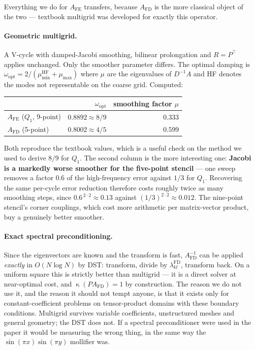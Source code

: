 \documentclass[11pt]{article}
\newcommand{\Afd}{A_{\mathrm{FD}}}
\newcommand{\Afe}{A_{\mathrm{FE}}}
\DeclareMathOperator{\cond}{\kappa}
\begin{document}
Everything we do for $\Afe$ transfers, because $\Afd$ is the more classical object of the two ---
textbook multigrid was developed for exactly this operator.

\paragraph{Geometric multigrid.} A V-cycle with damped-Jacobi smoothing, bilinear prolongation and
$R=P^\top$ applies unchanged. Only the smoother parameter differs. The optimal damping is
$\omega_{\mathrm{opt}} = 2/(\mu^{\mathrm{HF}}_{\min} + \mu_{\max})$ where $\mu$ are the eigenvalues
of $D^{-1}A$ and HF denotes the modes not representable on the coarse grid. Computed:

\begin{center}
\begin{tabular}{lrr}
\toprule
& $\omega_{\mathrm{opt}}$ & smoothing factor $\mu$ \\
\midrule
$\Afe$ ($Q_1$, 9-point) & $0.8892 \approx 8/9$ & $0.333$ \\
$\Afd$ (5-point)        & $0.8002 \approx 4/5$ & $0.599$ \\
\bottomrule
\end{tabular}
\end{center}

Both reproduce the textbook values, which is a useful check on the method we used to derive $8/9$
for $Q_1$. The second column is the more interesting one: \textbf{Jacobi is a markedly worse
smoother for the five-point stencil} --- one sweep removes a factor $0.6$ of the high-frequency
error against $1/3$ for $Q_1$. Recovering the same per-cycle error reduction therefore costs
roughly twice as many smoothing steps, since $0.6^{\,2\cdot 2} \approx 0.13$ against
$(1/3)^{2\cdot2} \approx 0.012$. The nine-point stencil's corner couplings, which cost more
arithmetic per matrix-vector product, buy a genuinely better smoother.

\paragraph{Exact spectral preconditioning.} Since the eigenvectors are known and the transform is
fast, $\Afd^{-1}$ can be applied \emph{exactly} in $O(N\log N)$ by DST: transform, divide by
$\lambda^{\mathrm{FD}}_{kl}$, transform back. On a uniform square this is strictly better than
multigrid --- it is a direct solver at near-optimal cost, and $\cond(P\Afd)=1$ by construction.
The reason we do not use it, and the reason it should not tempt anyone, is that it exists only for
constant-coefficient problems on tensor-product domains with these boundary conditions. Multigrid
survives variable coefficients, unstructured meshes and general geometry; the DST does not. If a
spectral preconditioner were used in the paper it would be measuring the wrong thing, in the same
way the $\sin(\pi x)\sin(\pi y)$ mollifier was.
\end{document}
